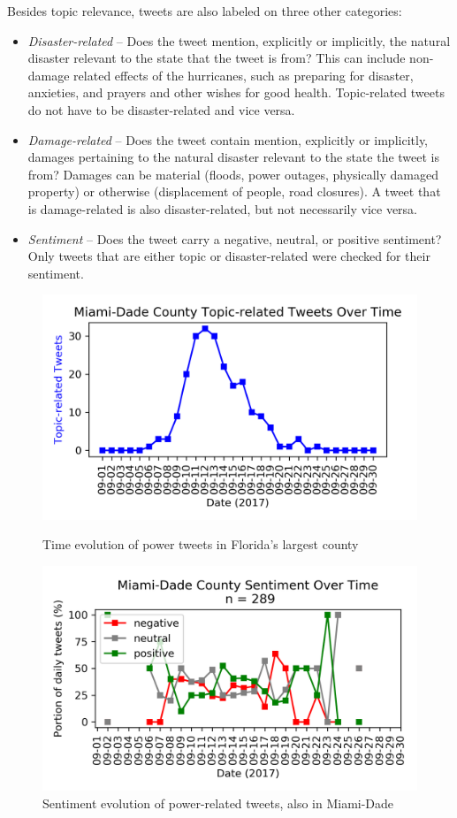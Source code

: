 \documentclass[12pt, a4paper]{article}
\begin{document}
    Besides topic relevance, tweets are also labeled on three other categories:
    \begin{itemize}
        \item \textit{Disaster-related} -- Does the tweet mention, explicitly or implicitly, the natural disaster relevant to the state that the tweet is from? This can include non-damage related effects of the hurricanes, such as preparing for disaster, anxieties, and prayers and other wishes for good health. Topic-related tweets do not have to be disaster-related and vice versa.
        
        \item \textit{Damage-related} -- Does the tweet contain mention, explicitly or implicitly, damages pertaining to the natural disaster relevant to the state the tweet is from? Damages can be material (floods, power outages, physically damaged property) or otherwise (displacement of people, road closures). A tweet that is damage-related is also disaster-related, but not necessarily vice versa.
        
        \item \textit{Sentiment} -- Does the tweet carry a negative, neutral, or positive sentiment? Only tweets that are either topic or disaster-related were checked for their sentiment.
    \end{itemize}
\begin{figure}[t!]
    \centering
    \includegraphics[width=0.9\linewidth]{Miami-Dade_topic.png}
    \caption{Time evolution of power tweets in Florida's largest county}
    \label{fig:my_label}
    \vspace{3em}
    \centering
    \includegraphics[width=0.9\linewidth]{Miami-Dade_sentiment.png}
    \caption{Sentiment evolution of power-related tweets, also in Miami-Dade}
    \label{fig:my_label2}
\end{figure}
\end{document}
